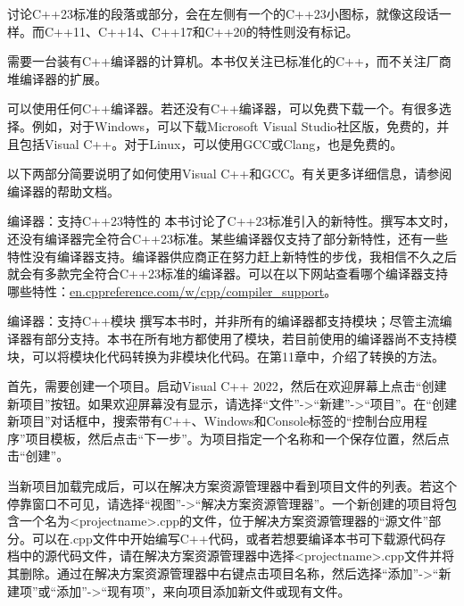 

讨论C++23标准的段落或部分，会在左侧有一个的C++23小图标，就像这段话一样。而C++11、C++14、C++17和C++20的特性则没有标记。


需要一台装有C++编译器的计算机。本书仅关注已标准化的C++，而不关注厂商堆编译器的扩展。


可以使用任何C++编译器。若还没有C++编译器，可以免费下载一个。有很多选择。例如，对于Windows，可以下载Microsoft Visual Studio社区版，免费的，并且包括Visual C++。对于Linux，可以使用GCC或Clang，也是免费的。

以下两部分简要说明了如何使用Visual C++和GCC。有关更多详细信息，请参阅编译器的帮助文档。

\begin{myTip}{编译器：支持C++23特性的}
本书讨论了C++23标准引入的新特性。撰写本文时，还没有编译器完全符合C++23标准。某些编译器仅支持了部分新特性，还有一些特性没有编译器支持。编译器供应商正在努力赶上新特性的步伐，我相信不久之后就会有多款完全符合C++23标准的编译器。可以在以下网站查看哪个编译器支持哪些特性：\url{en.cppreference.com/w/cpp/compiler_support}。
\end{myTip}

\begin{myTip}{编译器：支持C++模块}
撰写本书时，并非所有的编译器都支持模块；尽管主流编译器有部分支持。本书在所有地方都使用了模块，若目前使用的编译器尚不支持模块，可以将模块化代码转换为非模块化代码。在第11章中，介绍了转换的方法。
\end{myTip}


首先，需要创建一个项目。启动Visual C++ 2022，然后在欢迎屏幕上点击“创建新项目”按钮。如果欢迎屏幕没有显示，请选择“文件”->“新建”->“项目”。在“创建新项目”对话框中，搜索带有C++、Windows和Console标签的“控制台应用程序”项目模板，然后点击“下一步”。为项目指定一个名称和一个保存位置，然后点击“创建”。

当新项目加载完成后，可以在解决方案资源管理器中看到项目文件的列表。若这个停靠窗口不可见，请选择“视图”->“解决方案资源管理器”。一个新创建的项目将包含一个名为<projectname>.cpp的文件，位于解决方案资源管理器的“源文件”部分。可以在.cpp文件中开始编写C++代码，或者若想要编译本书可下载源代码存档中的源代码文件，请在解决方案资源管理器中选择<projectname>.cpp文件并将其删除。通过在解决方案资源管理器中右键点击项目名称，然后选择“添加”->“新建项”或“添加”->“现有项”，来向项目添加新文件或现有文件。

